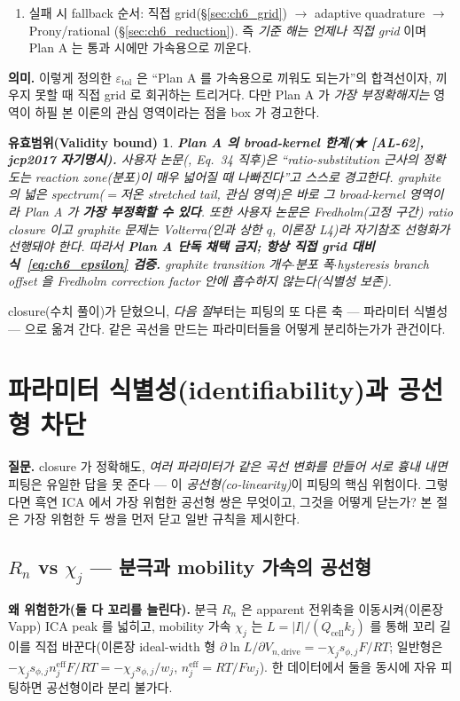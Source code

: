 \documentclass[11pt,a4paper]{article}
\newtheorem*{boundbox}{유효범위(Validity bound)}
\newcommand{\eff}{\mathrm{eff}}
\newcommand{\drive}{\mathrm{drive}}
\newcommand{\cell}{\mathrm{cell}}
\newcommand{\tol}{\mathrm{tol}}
\newcommand{\AL}[1]{\textsf{[AL-#1]}}
\begin{document}
\begin{enumerate}[label=F\arabic*),leftmargin=2.4em,start=6]
\item 실패 시 fallback 순서: 직접 grid(\S\ref{sec:ch6_grid}) $\to$ adaptive quadrature $\to$ Prony/rational
  (\S\ref{sec:ch6_reduction}). 즉 \emph{기준 해는 언제나 직접 grid} 이며 Plan A 는 통과 시에만 가속용으로 끼운다.
\end{enumerate}
\textbf{의미.} 이렇게 정의한 $\varepsilon_\tol$ 은 ``Plan A 를 가속용으로 끼워도 되는가''의 합격선이자, 끼우지
못할 때 직접 grid 로 회귀하는 트리거다. 다만 Plan A 가 \emph{가장 부정확해지는} 영역이 하필 본 이론의 관심
영역이라는 점을 box 가 경고한다.
\begin{boundbox}
\textbf{Plan A 의 broad-kernel 한계(★ \AL{62}, jcp2017 자기명시).} 사용자 논문(\cite{jcp2017}, Eq.~34 직후)은
``ratio-substitution 근사의 정확도는 reaction zone(분포)이 매우 넓어질 때 나빠진다''고 \emph{스스로 경고}한다.
graphite 의 넓은 spectrum($=$저온 stretched tail, \emph{관심 영역})은 바로 그 broad-kernel 영역이라 Plan A 가
\textbf{가장 부정확할 수 있다}. 또한 사용자 논문은 \emph{Fredholm}(고정 구간) ratio closure 이고 graphite 문제는
\emph{Volterra}(인과 상한 $q$, 이론장 L4)라 자기참조 선형화가 선행돼야 한다. 따라서 \textbf{Plan A 단독 채택 금지;
항상 직접 grid 대비 식~\eqref{eq:ch6_epsilon} 검증.} graphite transition 개수$\cdot$분포 폭$\cdot$hysteresis branch
offset 을 Fredholm correction factor 안에 흡수하지 않는다(식별성 보존).
\end{boundbox}

closure(수치 풀이)가 닫혔으니, \emph{다음 절}부터는 피팅의 또 다른 축 — 파라미터 식별성 — 으로 옮겨 간다.
같은 곡선을 만드는 파라미터들을 어떻게 분리하는가가 관건이다.

\section{파라미터 식별성(identifiability)과 공선형 차단}\label{sec:ch6_identif}
\textbf{질문.} closure 가 정확해도, \emph{여러 파라미터가 같은 곡선 변화를 만들어 서로 흉내 내면} 피팅은 유일한
답을 못 준다 — 이 \emph{공선형(co-linearity)}이 피팅의 핵심 위험이다. 그렇다면 흑연 ICA 에서 가장 위험한 공선형
쌍은 무엇이고, 그것을 어떻게 닫는가? 본 절은 가장 위험한 두 쌍을 먼저 닫고 일반 규칙을 제시한다.

\subsection{$R_n$ vs $\chi_j$ — 분극과 mobility 가속의 공선형}\label{sec:ch6_RnChi}
\textbf{왜 위험한가(둘 다 꼬리를 늘린다).} 분극 $R_n$ 은 apparent 전위축을 이동시켜(이론장 Vapp) ICA peak 를
넓히고, mobility 가속 $\chi_j$ 는 $L=|I|/(Q_\cell k_j)$ 를 통해 꼬리 길이를 직접 바꾼다(이론장 ideal-width 형
$\partial\ln L/\partial V_{n,\drive}=-\chi_j s_{\phi,j}F/RT$; 일반형은 $-\chi_j s_{\phi,j}n_j^{\eff}F/RT
=-\chi_j s_{\phi,j}/w_j$, $n_j^{\eff}=RT/Fw_j$). 한 데이터에서 둘을 동시에 자유 피팅하면 공선형이라 분리 불가다.
\end{document}
